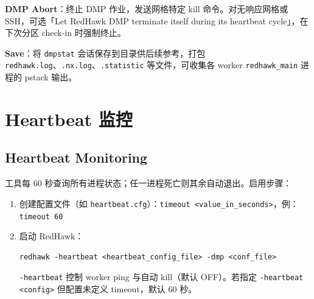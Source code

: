 \textbf{DMP Abort}：终止 DMP 作业，发送网格特定 kill 命令。对无响应网格或 SSH，可选「Let RedHawk DMP terminate itself during its heartbeat cycle」，在下次分区 check-in 时强制终止。

\textbf{Save}：将 \texttt{dmpstat} 会话保存到目录供后续参考，打包 \texttt{redhawk.log}、\texttt{.nx.log}、\texttt{.statistic} 等文件，可收集各 worker \texttt{redhawk\_main} 进程的 pstack 输出。

\section{Heartbeat 监控}
\subsection*{Heartbeat Monitoring}

工具每 60 秒查询所有进程状态；任一进程死亡则其余自动退出。启用步骤：
\begin{enumerate}
  \item 创建配置文件（如 \texttt{heartbeat.cfg}）：\texttt{timeout <value\_in\_seconds>}，例：\texttt{timeout 60}
  \item 启动 RedHawk：
\begin{lstlisting}
redhawk -heartbeat <heartbeat_config_file> -dmp <conf_file>
\end{lstlisting}
  \texttt{-heartbeat} 控制 worker ping 与自动 kill（默认 OFF）。若指定 \texttt{-heartbeat <config>} 但配置未定义 timeout，默认 60 秒。
\end{enumerate}
